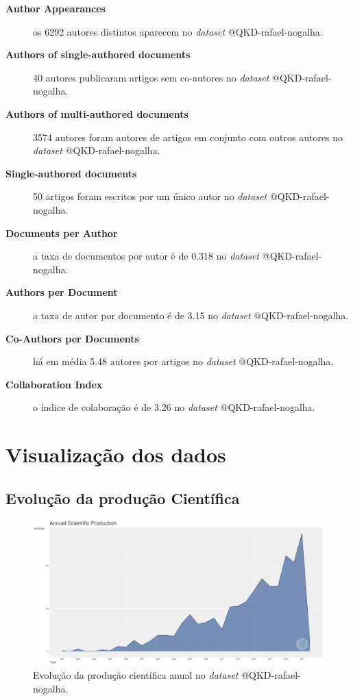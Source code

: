 \begin{description}
    \item[\textbf{Author Appearances}] os 6292 autores distintos aparecem no \textit{dataset} @QKD-rafael-nogalha.
    \item[\textbf{Authors of single-authored documents}] 40 autores publicaram artigos sem co-autores no \textit{dataset} @QKD-rafael-nogalha.
    \item[\textbf{Authors of multi-authored documents}] 3574 autores foram autores de artigos em conjunto com outros autores no \textit{dataset} @QKD-rafael-nogalha.
    \item[\textbf{Single-authored documents}] 50 artigos foram escritos por um único autor no \textit{dataset} @QKD-rafael-nogalha.
    \item[\textbf{Documents per Author}] a taxa de documentos por autor é de 0.318 no \textit{dataset} @QKD-rafael-nogalha.
    \item[\textbf{Authors per Document}] a taxa de autor por documento é de 3.15 no \textit{dataset} @QKD-rafael-nogalha.
    \item[\textbf{Co-Authors per Documents}] há em média 5.48 autores por artigos no \textit{dataset} @QKD-rafael-nogalha.
    \item[\textbf{Collaboration Index}] o índice de colaboração é de 3.26 no \textit{dataset} @QKD-rafael-nogalha.
\end{description}

\section{Visualização dos dados}

\subsection{Evolução da produção Científica}

\begin{figure}[H]
    \centering
    \includegraphics[width=1\textwidth]{experiments/rafaelnogalha/PesquisaBibliografica/QKDSegurancaComputacional/images/producao-cientifica-anual.png}
    \caption{Evolução da produção científica anual no \textit{dataset} @QKD-rafael-nogalha.}
    \label{fig:evol:anual:@QKD-rafael-nogalha}
\end{figure}

